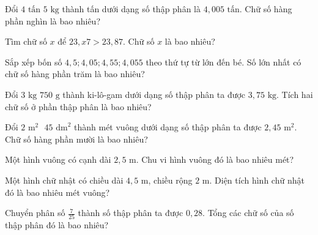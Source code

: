 \begin{ex}
  Đổi $4\text{ tấn } 5\text{ kg}$ thành tấn dưới dạng số thập phân là $4{,}005\text{ tấn}$. Chữ số hàng phần nghìn là bao nhiêu?
\end{ex}

\begin{ex}
  Tìm chữ số $x$ để $23{,}x7 > 23{,}87$. Chữ số $x$ là bao nhiêu?
\end{ex}

\begin{ex}
  Sắp xếp bốn số $4{,}5; 4{,}05; 4{,}55; 4{,}055$ theo thứ tự từ lớn đến bé. Số lớn nhất có chữ số hàng phần trăm là bao nhiêu?
\end{ex}

\begin{ex}
  Đổi $3\text{ kg } 750\text{ g}$ thành ki-lô-gam dưới dạng số thập phân ta được $3{,}75\text{ kg}$. Tích hai chữ số ở phần thập phân là bao nhiêu?
\end{ex}

\begin{ex}
  Đổi $2\text{ m}^2\text{ } 45\text{ dm}^2$ thành mét vuông dưới dạng số thập phân ta được $2{,}45\text{ m}^2$. Chữ số hàng phần mười là bao nhiêu?
\end{ex}

\begin{ex}
  Một hình vuông có cạnh dài $2{,}5\text{ m}$. Chu vi hình vuông đó là bao nhiêu mét?
\end{ex}

\begin{ex}
  Một hình chữ nhật có chiều dài $4{,}5\text{ m}$, chiều rộng $2\text{ m}$. Diện tích hình chữ nhật đó là bao nhiêu mét vuông?
\end{ex}

\begin{ex}
  Chuyển phân số $\frac{7}{25}$ thành số thập phân ta được $0{,}28$. Tổng các chữ số của số thập phân đó là bao nhiêu?
\end{ex}

